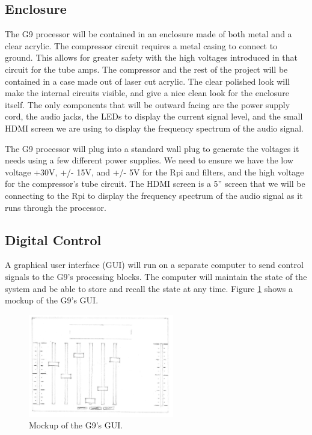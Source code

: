 \documentclass[journal]{IEEEtran}
\begin{document}
	\subsection{Enclosure}
	The G9 processor will be contained in an enclosure made of both metal and a clear acrylic.  The compressor circuit requires a metal casing to connect to ground.  This allows for greater safety with the high voltages introduced in that circuit for the tube amps.  The compressor and the rest of the project will be contained in a case made out of laser cut acrylic.  The clear polished look will make the internal circuits visible, and give a nice clean look for the enclosure itself.  The only components that will be outward facing are the power supply cord, the audio jacks, the LEDs to display the current signal level, and the small HDMI screen we are using to display the frequency spectrum of the audio signal.  
	
	The G9 processor will plug into a standard wall plug to generate the voltages it needs using a few different power supplies.  We need to ensure we have the low voltage +30V, +/- 15V,  and +/- 5V for the Rpi and filters, and the high voltage for the compressor’s tube circuit.  The HDMI screen is a 5'' screen that we will be connecting to the Rpi to display the frequency spectrum of the audio signal as it runs through the processor.  
	
	
	
	\subsection{Digital Control}
	A graphical user interface (GUI) will run on a separate computer to send control signals to the G9's processing blocks. The computer will maintain the state of the system and be able to store and recall the state at any time. Figure \ref{fig:gui} shows a mockup of the G9's GUI.
	
	\begin{figure}
		\centering
		\includegraphics[width=2.5in]{gui}
		\caption{Mockup of the G9's GUI. }
		\label{fig:gui}
	\end{figure}
	
\end{document}
